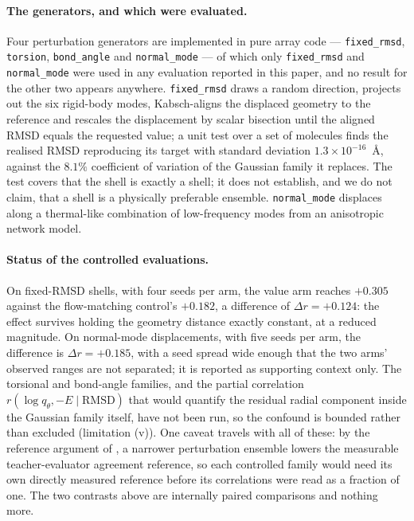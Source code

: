 \paragraph{The generators, and which were evaluated.} Four perturbation generators are
implemented in pure array code --- \texttt{fixed\_rmsd}, \texttt{torsion},
\texttt{bond\_angle} and \texttt{normal\_mode} --- of which only \texttt{fixed\_rmsd}
and \texttt{normal\_mode} were used in any evaluation reported in this paper, and no
result for the other two appears anywhere. \texttt{fixed\_rmsd} draws a random
direction, projects out the six rigid-body modes, Kabsch-aligns the displaced geometry
to the reference and rescales the displacement by scalar bisection until the aligned
RMSD equals the requested value; a unit test over a set of molecules finds the realised
RMSD reproducing its target with standard deviation $1.3\times10^{-16}$~\AA{}, against
the $8.1\%$ coefficient of variation of the Gaussian family it replaces. The test
covers that the shell is exactly a shell; it does not establish, and we do not claim,
that a shell is a physically preferable ensemble. \texttt{normal\_mode} displaces along
a thermal-like combination of low-frequency modes from an anisotropic network model.

\paragraph{Status of the controlled evaluations.} On fixed-RMSD shells, with four seeds
per arm, the value arm reaches $+0.305$ against the flow-matching control's $+0.182$,
a difference of $\Delta r = +0.124$: the effect survives holding the geometry
distance exactly constant, at a reduced magnitude. On normal-mode displacements, with
five seeds per arm, the difference is $\Delta r = +0.185$, with a seed spread wide
enough that the two arms' observed ranges are not separated; it is reported as
supporting context only. The
torsional and bond-angle families, and the partial correlation
$r(\log q_\theta, -E \mid \mathrm{RMSD})$ that would quantify the residual radial
component inside the Gaussian family itself, have not been run, so the confound is
bounded rather than excluded (limitation (v)). One caveat travels with all of these:
by the reference argument of , a narrower perturbation ensemble
lowers the measurable teacher-evaluator agreement reference, so each controlled family would need
its own directly measured reference before its correlations were read as a fraction of
one. The two contrasts above are internally paired comparisons and nothing more.

